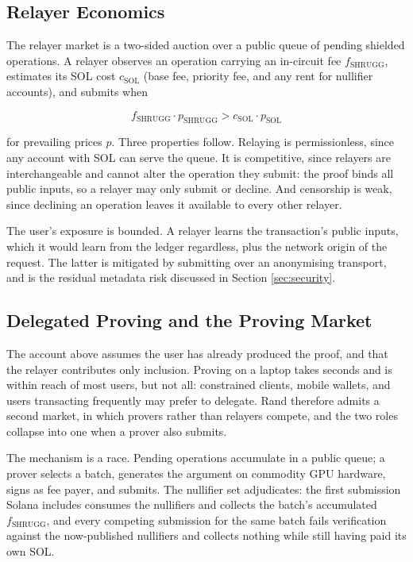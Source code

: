 \documentclass[11pt,a4paper]{article}
\begin{document}
\subsection{Relayer Economics}

The relayer market is a two-sided auction over a public queue of pending shielded operations. A relayer observes an operation carrying an in-circuit fee $f_{\text{SHRUGG}}$, estimates its SOL cost $c_{\text{SOL}}$ (base fee, priority fee, and any rent for nullifier accounts), and submits when

\begin{equation}
f_{\text{SHRUGG}} \cdot p_{\text{SHRUGG}} > c_{\text{SOL}} \cdot p_{\text{SOL}}
\end{equation}

for prevailing prices $p$. Three properties follow. Relaying is permissionless, since any account with SOL can serve the queue. It is competitive, since relayers are interchangeable and cannot alter the operation they submit: the proof binds all public inputs, so a relayer may only submit or decline. And censorship is weak, since declining an operation leaves it available to every other relayer.

The user's exposure is bounded. A relayer learns the transaction's public inputs, which it would learn from the ledger regardless, plus the network origin of the request. The latter is mitigated by submitting over an anonymising transport, and is the residual metadata risk discussed in Section \ref{sec:security}.

\subsection{Delegated Proving and the Proving Market}
\label{sec:provingmarket}

The account above assumes the user has already produced the proof, and that the relayer contributes only inclusion. Proving on a laptop takes seconds and is within reach of most users, but not all: constrained clients, mobile wallets, and users transacting frequently may prefer to delegate. Rand therefore admits a second market, in which provers rather than relayers compete, and the two roles collapse into one when a prover also submits.

The mechanism is a race. Pending operations accumulate in a public queue; a prover selects a batch, generates the argument on commodity GPU hardware, signs as fee payer, and submits. The nullifier set adjudicates: the first submission Solana includes consumes the nullifiers and collects the batch's accumulated $f_{\text{SHRUGG}}$, and every competing submission for the same batch fails verification against the now-published nullifiers and collects nothing while still having paid its own SOL.
\end{document}
